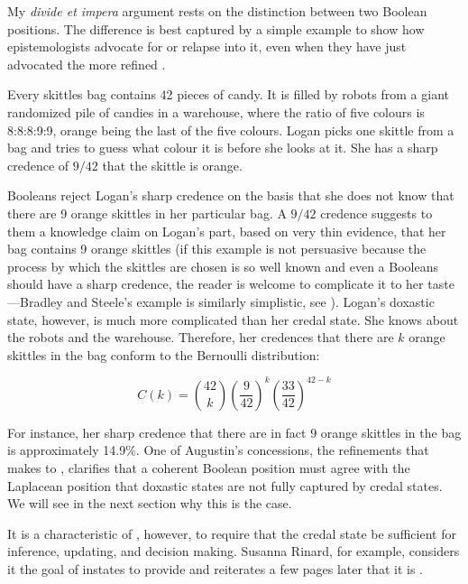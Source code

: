 \documentclass[phd,12pt,oneside]{ubcthesis}
\begin{document}
My \emph{divide et impera} argument rests on the distinction between
two Boolean positions. The difference is best captured by a simple
example to show how epistemologists advocate for {\anderson} or
relapse into it, even when they have just advocated the more refined
{\augustin}.

\begin{quotex}
  \label{ex:skittles} Every skittles bag contains
  42 pieces of candy. It is filled by robots from a giant randomized
  pile of candies in a warehouse, where the ratio of five colours is
  8:8:8:9:9, orange being the last of the five colours. Logan picks
  one skittle from a bag and tries to guess what colour it is before
  she looks at it. She has a sharp credence of $9/42$ that the skittle
  is orange.
\end{quotex}

{\anderson} Booleans reject Logan's sharp credence on the basis that
she does not know that there are 9 orange skittles in her particular
bag. A $9/42$ credence suggests to them a knowledge claim on Logan's
part, based on very thin evidence, that her bag contains 9 orange
skittles (if this example is not persuasive because the process by
which the skittles are chosen is so well known and even a {\anderson}
Booleans should have a sharp credence, the reader is welcome to
complicate it to her taste---Bradley and Steele's example is similarly
simplistic, see ). Logan's doxastic
state, however, is much more complicated than her credal state. She
knows about the robots and the warehouse. Therefore, her credences
that there are $k$ orange skittles in the bag conform to the Bernoulli
distribution:

\begin{equation}
  \label{eq:bern}
  C(k)=\binom{42}{k}\left(\frac{9}{42}\right)^{k}\left(\frac{33}{42}\right)^{42-k}
\end{equation}

{\noindent}For instance, her sharp credence that there are in fact $9$ orange
skittles in the bag is approximately 14.9\%. One of Augustin's
concessions, the refinements that {\augustin} makes to {\anderson},
clarifies that a coherent Boolean position must agree with the
Laplacean position that doxastic states are not fully captured by
credal states. We will see in the next section why this is the case.

It is a characteristic of {\anderson}, however, to require that
the credal state be sufficient for inference, updating, and decision
making. Susanna Rinard, for example, considers it the goal of instates
to provide   and reiterates a few pages later
that it is 
.
\end{document}
